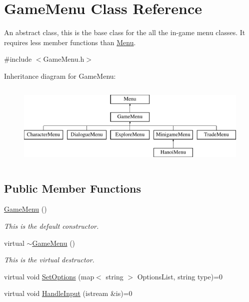 \hypertarget{classGameMenu}{\section{Game\-Menu Class Reference}
\label{classGameMenu}
}


An abstract class, this is the base class for the all the in-\/game menu classes. It requires less member functions than \hyperlink{classMenu}{Menu}.  




{\ttfamily \#include $<$Game\-Menu.\-h$>$}

Inheritance diagram for Game\-Menu\-:\begin{figure}[H]
\begin{center}
\leavevmode
\includegraphics[height=4.000000cm]{classGameMenu}
\end{center}
\end{figure}
\subsection*{Public Member Functions}
\begin{DoxyCompactItemize}
\item 
\hypertarget{classGameMenu_ae31c50148abf655297a2a3eab53c15a3}{\hyperlink{classGameMenu_ae31c50148abf655297a2a3eab53c15a3}{Game\-Menu} ()}\label{classGameMenu_ae31c50148abf655297a2a3eab53c15a3}

\begin{DoxyCompactList}\small\item\em This is the default constructor. \end{DoxyCompactList}\item 
\hypertarget{classGameMenu_a8901f02e327b01a79b6e10a580154c44}{virtual \hyperlink{classGameMenu_a8901f02e327b01a79b6e10a580154c44}{$\sim$\-Game\-Menu} ()}\label{classGameMenu_a8901f02e327b01a79b6e10a580154c44}

\begin{DoxyCompactList}\small\item\em This is the virtual destructor. \end{DoxyCompactList}\item 
virtual void \hyperlink{classGameMenu_a25172d8d311df4f7b79074d60f74642e}{Set\-Options} (map$<$ string $>$ Options\-List, string type)=0
\item 
virtual void \hyperlink{classGameMenu_a02ba09feedece5773f44ba865ccffb42}{Handle\-Input} (istream \&is)=0
\end{DoxyCompactItemize}
